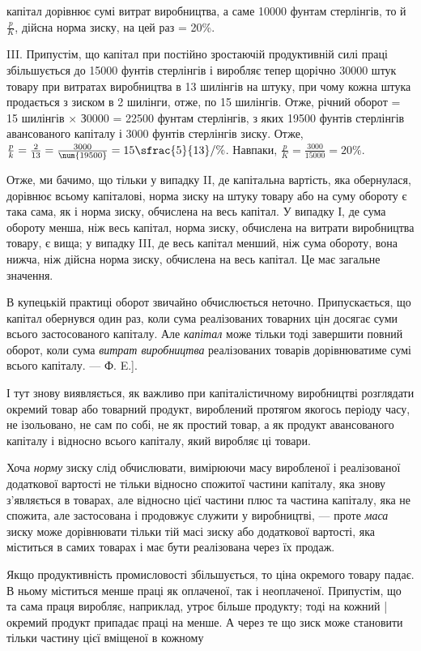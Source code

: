 \parcont{}  %
капітал дорівнює сумі витрат виробництва, а саме \num{10000} фунтам стерлінгів, то й $\frac{p}{K}$, дійсна норма
зиску, на цей раз = 20\%.

III. Припустім, що капітал при постійно зростаючій продуктивній силі праці збільшується до \num{15000}
фунтів стерлінгів і виробляє тепер щорічно \num{30000} штук товару при витратах виробництва в 13 шилінгів
на штуку, при чому кожна штука продається з зиском в 2 шилінги, отже, по 15 шилінгів. Отже, річний
оборот = 15 шилінгів × З0000 = \num{22500} фунтам стерлінгів, з яких \num{19500} фунтів стерлінгів
авансованого капіталу і 3000 фунтів стерлінгів зиску. Отже,
$\frac{p}{k} = \frac{2}{13} = \frac{3000}{\num{19500}} = 15\sfrac{5}{13}/\%$.
Навпаки, $\frac{p}{K} = \frac{3000}{\num{15000}} = 20\%$.

Отже, ми бачимо, що тільки у випадку II, де капітальна вартість, яка обернулася, дорівнює всьому
капіталові, норма зиску на штуку товару або на суму обороту є така сама, як і норма зиску, обчислена
на весь капітал. У випадку І, де сума обороту менша, ніж весь капітал, норма зиску, обчислена на
витрати виробництва товару, є вища; у випадку III, де весь капітал менший, ніж сума обороту, вона
нижча, ніж дійсна норма зиску, обчислена на весь капітал. Це має загальне значення.

В купецькій практиці оборот звичайно обчислюється неточно. Припускається, що капітал обернувся один
раз, коли сума реалізованих товарних цін досягає суми всього застосованого капіталу. Але \emph{капітал}
може тільки тоді завершити повний оборот, коли сума \emph{витрат виробництва} реалізованих товарів
дорівнюватиме сумі всього капіталу. — Ф. E.].

І тут знову виявляється, як важливо при капіталістичному виробництві розглядати окремий товар або
товарний продукт, вироблений протягом якогось періоду часу, не ізольовано, не сам по собі, не як
простий товар, а як продукт авансованого капіталу і відносно всього капіталу, який виробляє ці
товари.

Хоча \emph{норму} зиску слід обчислювати, вимірюючи масу виробленої і реалізованої додаткової вартості не
тільки відносно спожитої частини капіталу, яка знову з’являється в товарах, але відносно цієї
частини плюс та частина капіталу, яка не спожита, але застосована і продовжує служити у виробництві,
— проте \emph{маса} зиску може дорівнювати тільки тій масі зиску або додаткової вартості, яка міститься в
самих товарах і має бути реалізована через їх продаж.

Якщо продуктивність промисловості збільшується, то ціна окремого товару падає. В ньому міститься
менше праці як оплаченої, так і неоплаченої. Припустім, що та сама праця виробляє, наприклад, утроє
більше продукту; тоді на кожний | окремий продукт припадає праці на  менше. А через те що зиск
може становити тільки частину цієї вміщеної в кожному
\parbreak{}  %
